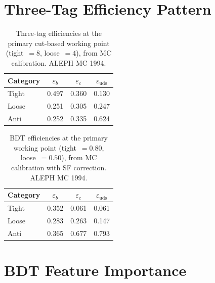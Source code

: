 \documentclass[11pt,a4paper]{article}
\begin{document}
\clearpage
\appendix

\section{Three-Tag Efficiency Pattern}
\label{app:efficiencies}

\begin{table}[htbp]
\centering
\caption{Three-tag efficiencies at the primary cut-based working point
  (tight~$=8$, loose~$=4$), from MC calibration.  ALEPH MC 1994.}
\label{tbl:efficiencies}
\begin{tabular}{lccc}
\toprule
Category & $\varepsilon_b$ & $\varepsilon_c$ & $\varepsilon_\mathrm{uds}$ \\
\midrule
Tight  & 0.497 & 0.360 & 0.130 \\
Loose  & 0.251 & 0.305 & 0.247 \\
Anti   & 0.252 & 0.335 & 0.624 \\
\bottomrule
\end{tabular}
\end{table}

\begin{table}[htbp]
\centering
\caption{BDT efficiencies at the primary working point
  (tight~$=0.80$, loose~$=0.50$), from MC calibration with SF correction.
  ALEPH MC 1994.}
\label{tbl:bdt-efficiencies}
\begin{tabular}{lccc}
\toprule
Category & $\varepsilon_b$ & $\varepsilon_c$ & $\varepsilon_\mathrm{uds}$ \\
\midrule
Tight  & 0.352 & 0.061 & 0.061 \\
Loose  & 0.283 & 0.263 & 0.147 \\
Anti   & 0.365 & 0.677 & 0.793 \\
\bottomrule
\end{tabular}
\end{table}

\section{BDT Feature Importance}
\label{app:bdt-features}
\end{document}
